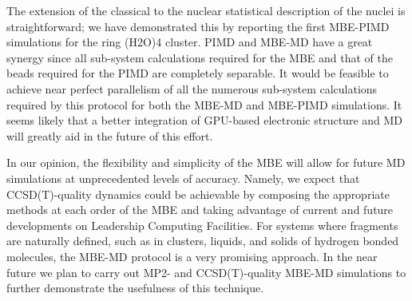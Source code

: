 \documentclass[11pt, proquest]{uwthesis}[2020/02/24]
\begin{document}
\par The extension of the classical to the nuclear statistical description of the nuclei is straightforward; we have demonstrated this by reporting the first MBE-PIMD simulations for the ring (H2O)4 cluster. PIMD and MBE-MD have a great synergy since all sub-system calculations required for the MBE and that of the beads required for the PIMD are completely separable. It would be feasible to achieve near perfect parallelism of all the numerous sub-system calculations required by this protocol for both the MBE-MD and MBE-PIMD simulations. It seems likely that a better integration of GPU-based electronic structure and MD will greatly aid in the future of this effort.

\par In our opinion, the flexibility and simplicity of the MBE will allow for future MD simulations at unprecedented levels of accuracy. Namely, we expect that CCSD(T)-quality dynamics could be achievable by composing the appropriate methods at each order of the MBE and taking advantage of current and future developments on Leadership Computing Facilities. For systems where fragments are naturally defined, such as in clusters, liquids, and solids of hydrogen bonded molecules, the MBE-MD protocol is a very promising approach. In the near future we plan to carry out MP2- and CCSD(T)-quality MBE-MD simulations to further demonstrate the usefulness of this technique.
\end{document}
